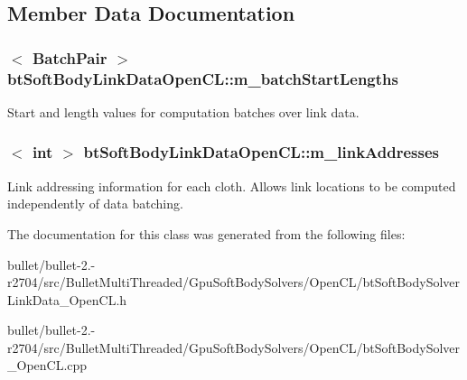 \subsection{Member Data Documentation}
\hypertarget{classbt_soft_body_link_data_open_c_l_a112ca944380e035211dc6184a9f04312}{
\subsubsection[{m\+\_\+batch\+Start\+Lengths}]{$<$ {\bf Batch\+Pair} $>$ bt\+Soft\+Body\+Link\+Data\+Open\+C\+L\+::m\+\_\+batch\+Start\+Lengths}}\label{classbt_soft_body_link_data_open_c_l_a112ca944380e035211dc6184a9f04312}
Start and length values for computation batches over link data. \hypertarget{classbt_soft_body_link_data_open_c_l_a0e7f46fa09dc03865495188be20fe1d4}{
\subsubsection[{m\+\_\+link\+Addresses}]{$<$ int $>$ bt\+Soft\+Body\+Link\+Data\+Open\+C\+L\+::m\+\_\+link\+Addresses}}\label{classbt_soft_body_link_data_open_c_l_a0e7f46fa09dc03865495188be20fe1d4}
Link addressing information for each cloth. Allows link locations to be computed independently of data batching. 

The documentation for this class was generated from the following files\+:\begin{DoxyCompactItemize}
\item 
bullet/bullet-\/2.-\/r2704/src/\+Bullet\+Multi\+Threaded/\+Gpu\+Soft\+Body\+Solvers/\+Open\+C\+L/bt\+Soft\+Body\+Solver\+Link\+Data\+\_\+\+Open\+C\+L.\+h\item 
bullet/bullet-\/2.-\/r2704/src/\+Bullet\+Multi\+Threaded/\+Gpu\+Soft\+Body\+Solvers/\+Open\+C\+L/bt\+Soft\+Body\+Solver\+\_\+\+Open\+C\+L.\+cpp\end{DoxyCompactItemize}
